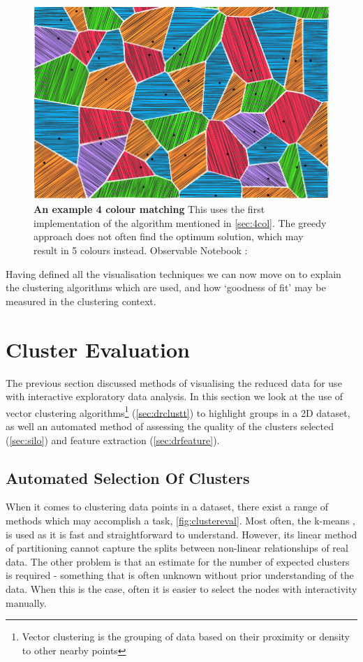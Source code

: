 \begin{figure}[H]
  \centering
\includegraphics[width=.8\textwidth]{4fig/4col.png}
\caption{\textbf{An example 4 colour matching} This uses the first implementation of the algorithm mentioned in \autoref{sec:4col}. The greedy approach does not often find the optimum solution, which may result in 5 colours instead. Observable Notebook : \cite{w4colobs}}\label{fig:4col}
\end{figure}


Having defined all the visualisation techniques we can now move on to explain the clustering algorithms which are used, and how `goodness of fit' may be measured in the clustering context.


\section{Cluster Evaluation}
The previous section discussed methods of visualising the reduced data for use with interactive exploratory data analysis. In this section we look at the use of vector clustering algorithms\footnote{Vector clustering is the grouping of data based on their proximity or density to other nearby points} (\autoref{sec:drclustt}) to highlight groups in a 2D dataset, as well an automated method of assessing the quality of the clusters selected (\autoref{sec:silo}) and feature extraction (\autoref{sec:drfeature}).



\subsection{Automated Selection Of Clusters}\label{sec:drclustt}
    When it comes to clustering data points in a dataset, there exist a range of methods which may accomplish a task, \autoref{fig:clustereval}. Most often, the k-means \citep{kmeans}, is used as it is fast and straightforward to understand. However, its linear method of partitioning cannot capture the splits between non-linear relationships of real data. The other problem is that an estimate for the number of expected clusters is required - something that is often unknown without prior understanding of the data. When this is the case, often it is easier to select the nodes with interactivity manually.

